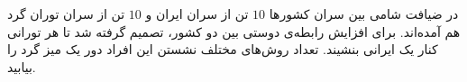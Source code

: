 \EXERCISE
در ضیافت شامی بین سران کشورها
$10$
تن از سران ایران و
$10$
تن از سران توران گرد هم آمده‌اند. برای افزایش رابطه‌ی دوستی بین دو کشور، تصمیم گرفته شد تا هر تورانی کنار یک ایرانی بنشیند. تعداد روش‌های مختلف نشستن این افراد دور یک میز گرد را بیابید.